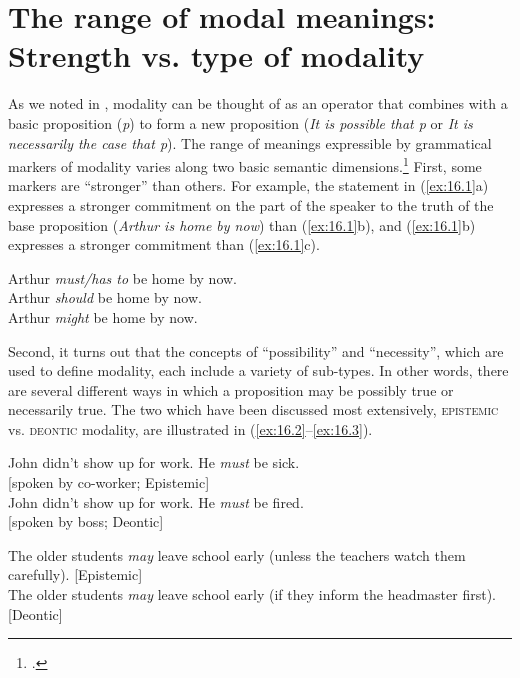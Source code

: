\section{The range of modal meanings: Strength vs. type of modality}\label{sec:16.2}

As we noted in , modality can be thought of as an operator that combines with a basic proposition (\textit{p}) to form a new proposition (\textit{It is possible that p} or \textit{It is necessarily the case that p}). The range of meanings expressible by grammatical markers of modality varies along two basic semantic dimensions.\footnote{\citet{Hacquard2011}.} First, some markers are “stronger” than others. For example, the statement in (\ref{ex:16.1}a) expresses a stronger commitment on the part of the speaker to the truth of the base proposition (\textit{Arthur is home by now}) than (\ref{ex:16.1}b), and (\ref{ex:16.1}b) expresses a stronger commitment than (\ref{ex:16.1}c).


\ea \label{ex:16.1}
\ea  Arthur \textit{must/has to} be home by now.\\
\ex Arthur \textit{should} be home by now.\\
\ex Arthur \textit{might} be home by now.
                       \z
\z


Second, it turns out that the concepts of “possibility” and “necessity”, which are used to define modality, each include a variety of sub-types. In other words, there are several different ways in which a proposition may be possibly true or necessarily true. The two which have been discussed most extensively, \textsc{epistemic} vs. \textsc{deontic} modality, are illustrated in (\ref{ex:16.2}--\ref{ex:16.3}).


\ea \label{ex:16.2}
\ea  John didn’t show up for work. He \textit{must} be sick. \\ \hfill [spoken by co-worker; Epistemic]\\
\ex John didn’t show up for work. He \textit{must} be fired.  \\  \hfill [spoken by boss; Deontic]
                       \z
\z

\ea \label{ex:16.3}
\ea  The older students \textit{may} leave school early (unless the teachers watch them carefully). \hfill [Epistemic]\\
\ex The older students \textit{may} leave school early (if they inform the headmaster first). \hfill [Deontic]
                       \z
\z


